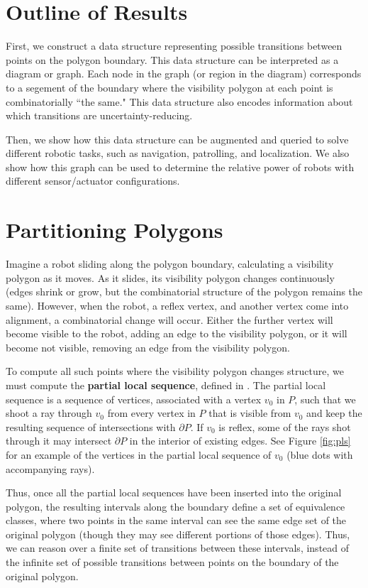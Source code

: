 \documentclass[]{styles/svproc}  %
\begin{document}
\section{Outline of Results}

First, we construct a data structure representing possible transitions between points on
the polygon boundary. This data structure can be interpreted as a diagram or graph. 
Each node in the graph (or region in the diagram) corresponds to a segement of the
boundary where the visibility polygon at each point is combinatorially ``the
same." This data structure also encodes information about which transitions are 
uncertainty-reducing.

Then, we show how this data structure can be augmented and queried to solve different
robotic tasks, such as navigation, patrolling, and localization. We also show how this graph can be used to determine the
relative power of robots with different sensor/actuator configurations.

\section{Partitioning Polygons}

Imagine a robot sliding along the polygon boundary, calculating a visibility
polygon as it moves. As it
slides, its visibility polygon changes continuously (edges shrink or grow, but
the combinatorial structure of the polygon remains the same). However, when
the robot, a reflex vertex, and another vertex come into alignment, a
combinatorial change will occur. Either the further vertex will become visible
to the robot, adding an edge to the visibility polygon, or it will become not
visible, removing an edge from the visibility polygon.

To compute all such points where the visibility polygon changes structure, we
must compute the \textbf{partial local sequence}, defined in \cite{rourke_viz}.
The partial local sequence is a sequence of vertices, associated with a vertex
$v_0$ in $P$, such that we shoot a ray through $v_0$ from every vertex in $P$
that is visible from $v_0$ and keep the resulting sequence of intersections with
$\partial P$. If $v_0$ is reflex, some of the rays shot through it may intersect
$\partial P$ in the interior of existing edges. See Figure \ref{fig:pls} for an
example of the vertices in the partial local sequence of $v_0$ (blue dots with
accompanying rays).

Thus, once all the partial local sequences have been inserted into the original
polygon, the resulting intervals along the boundary define a set of equivalence
classes, where two points in the same interval can see the same edge set of the
original polygon (though they may see different portions of those edges). Thus,
we can reason over a finite set of transitions between these intervals, instead
of the infinite set of possible transitions between points on the boundary of
the original polygon.
\end{document}

